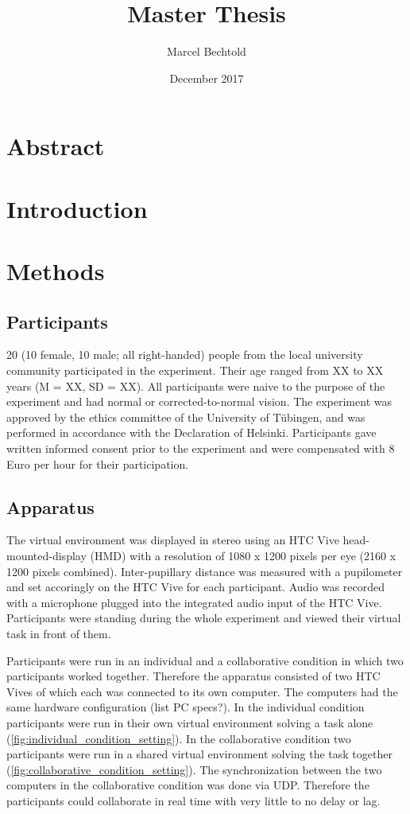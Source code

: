 \documentclass{article}
\title{Master Thesis}
\author{Marcel Bechtold}
\date{December 2017}
\begin{document}
\maketitle


\section{Abstract}

\section{Introduction}


\section{Methods}

\subsection{Participants}
20 (10 female, 10 male; all right-handed) people from the local university community participated in the experiment. Their age ranged from XX to XX years (M = XX, SD = XX). All participants were naive to the purpose of the experiment and had normal or corrected-to-normal vision. The experiment was approved by the ethics committee of the University of T\"ubingen, and was performed in accordance with the Declaration of Helsinki. Participants gave written informed consent prior to the experiment and were compensated with 8 Euro per hour for their participation. 

\subsection{Apparatus}
The virtual environment was displayed in stereo using an HTC Vive head-mounted-display (HMD) with a resolution of 1080 x 1200 pixels per eye (2160 x 1200 pixels combined). Inter-pupillary distance was measured with a pupilometer and set accoringly on the HTC Vive for each participant. Audio was recorded with a microphone plugged into the integrated audio input of the HTC Vive. Participants were standing during the whole experiment and viewed their virtual task in front of them.

Participants were run in an individual and a collaborative condition in which two participants worked together. Therefore the apparatus consisted of two HTC Vives of which each was connected to its own computer. The computers had the same hardware configuration (list PC specs?). In the individual condition participants were run in their own virtual environment solving a task alone (\ref{fig:individual_condition_setting}). In the collaborative condition two participants were run in a shared virtual environment solving the task together (\ref{fig:collaborative_condition_setting}). The synchronization between the two computers in the collaborative condition was done via UDP. Therefore the participants could collaborate in real time with very little to no delay or lag.
\end{document}
